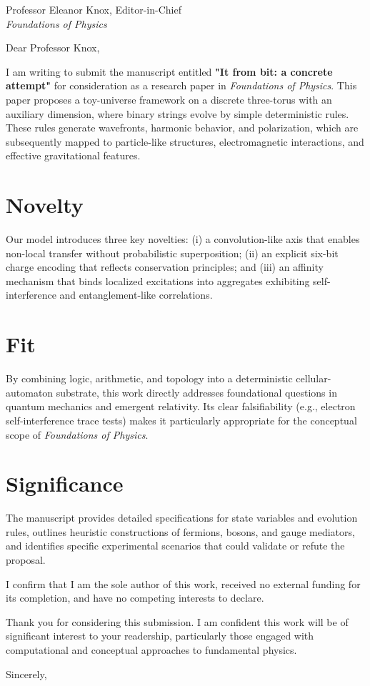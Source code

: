 \documentclass[11pt]{letter}
\date{\today}
\begin{document}
\begin{letter}{Professor Eleanor Knox, Editor-in-Chief\\
\textit{Foundations of Physics}}

\opening{Dear Professor Knox,}

I am writing to submit the manuscript entitled \textbf{"It from bit: a concrete attempt"} for consideration as a research paper in \textit{Foundations of Physics}. This paper proposes a toy-universe framework on a discrete three-torus with an auxiliary dimension, where binary strings evolve by simple deterministic rules. These rules generate wavefronts, harmonic behavior, and polarization, which are subsequently mapped to particle-like structures, electromagnetic interactions, and effective gravitational features.

\section*{Novelty}
Our model introduces three key novelties: (i) a convolution-like axis that enables non-local transfer without probabilistic superposition; (ii) an explicit six-bit charge encoding that reflects conservation principles; and (iii) an affinity mechanism that binds localized excitations into aggregates exhibiting self-interference and entanglement-like correlations.

\section*{Fit}
By combining logic, arithmetic, and topology into a deterministic cellular-automaton substrate, this work directly addresses foundational questions in quantum mechanics and emergent relativity. Its clear falsifiability (e.g., electron self-interference trace tests) makes it particularly appropriate for the conceptual scope of \textit{Foundations of Physics}.

\section*{Significance}
The manuscript provides detailed specifications for state variables and evolution rules, outlines heuristic constructions of fermions, bosons, and gauge mediators, and identifies specific experimental scenarios that could validate or refute the proposal.

I confirm that I am the sole author of this work, received no external funding for its completion, and have no competing interests to declare.

Thank you for considering this submission. I am confident this work will be of significant interest to your readership, particularly those engaged with computational and conceptual approaches to fundamental physics.

\closing{Sincerely,}

\signature{Alexandre Furtado Neto}

\end{letter}
\end{document}
